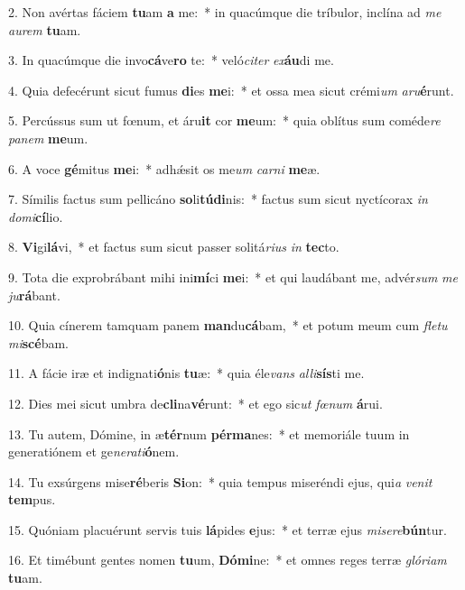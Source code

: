 2. Non avértas fáciem \textbf{tu}am \textbf{a} me:~*  in quacúmque die tríbulor, inclína ad \textit{me} \textit{au}\textit{rem} \textbf{tu}am.\

3. In quacúmque die invo\textbf{cá}ve\textbf{ro} te:~*  veló\textit{ci}\textit{ter} \textit{ex}\textbf{áu}di me.\

4. Quia defecérunt sicut fumus \textbf{di}es \textbf{me}i:~*  et ossa mea sicut crémi\textit{um} \textit{a}\textit{ru}\textbf{é}runt.\

5. Percússus sum ut fœnum, et áru\textbf{it} cor \textbf{me}um:~*  quia oblítus sum coméde\textit{re} \textit{pa}\textit{nem} \textbf{me}um.\

6. A voce \textbf{gé}mitus \textbf{me}i:~*  adhǽsit os me\textit{um} \textit{car}\textit{ni} \textbf{me}æ.\

7. Símilis factus sum pellicáno \textbf{so}li\textbf{tú}\textbf{di}nis:~*  factus sum sicut nyctícorax \textit{in} \textit{do}\textit{mi}\textbf{cí}lio.\

8. \textbf{Vi}gi\textbf{lá}vi,~*  et factus sum sicut passer solitá\textit{ri}\textit{us} \textit{in} \textbf{tec}to.\

9. Tota die exprobrábant mihi ini\textbf{mí}ci \textbf{me}i:~*  et qui laudábant me, advér\textit{sum} \textit{me} \textit{ju}\textbf{rá}bant.\

10. Quia cínerem tamquam panem \textbf{man}du\textbf{cá}bam,~*  et potum meum cum \textit{fle}\textit{tu} \textit{mi}\textbf{scé}bam.\

11. A fácie iræ et indignati\textbf{ó}nis \textbf{tu}æ:~*  quia éle\textit{vans} \textit{al}\textit{li}\textbf{sís}ti me.\

12. Dies mei sicut umbra de\textbf{cli}na\textbf{vé}runt:~*  et ego sic\textit{ut} \textit{fœ}\textit{num} \textbf{á}rui.\

13. Tu autem, Dómine, in æ\textbf{tér}num \textbf{pér}\textbf{ma}nes:~*  et memoriále tuum in generatiónem et ge\textit{ne}\textit{ra}\textit{ti}\textbf{ó}nem.\

14. Tu exsúrgens mise\textbf{ré}beris \textbf{Si}on:~*  quia tempus miseréndi ejus, qui\textit{a} \textit{ve}\textit{nit} \textbf{tem}pus.\

15. Quóniam placuérunt servis tuis \textbf{lá}pides \textbf{e}jus:~*  et terræ ejus \textit{mi}\textit{se}\textit{re}\textbf{bún}tur.\

16. Et timébunt gentes nomen \textbf{tu}um, \textbf{Dó}\textbf{mi}ne:~*  et omnes reges terræ \textit{gló}\textit{ri}\textit{am} \textbf{tu}am.\

